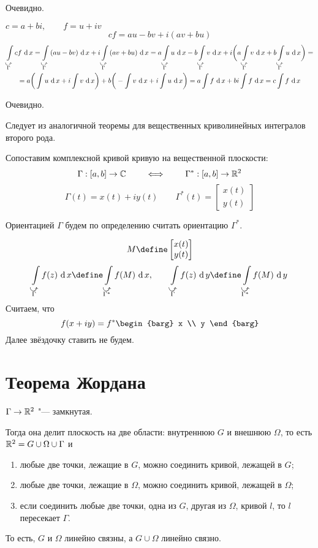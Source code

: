 \begin{eproof}
	\item Очевидно.
	\item $ c = a + bi, \qquad f = u + iv $
	$$ cf = au - bv + i(av + bu) $$
	\begin{multline*}
		\cint[x]{\curvedir \Gamma}{cf} = \cint[x]{\curvedir \Gamma}{(au - bv)} + i \cint[x]{\curvedir \Gamma}{(av + bu)} = a \cint[x]{\curvedir \Gamma}u - b \cint[x]{\curvedir \Gamma}v + i \bigg( a \cint[x]{\curvedir \Gamma}v + b \cint[x]{\curvedir \Gamma}u \bigg) = \\
		= a \bigg( \sint[x]u + i \sint[x]v \bigg) + b \bigg( - \sint[x]v + i \sint[x]u \bigg) = a \sint[x]f + bi \sint f = c \sint f
	\end{multline*}
	\item Очевидно.
	\item Следует из аналогичной теоремы для вещественных криволинейных интегралов второго рода.
\end{eproof}

Сопоставим комплексной кривой кривую на вещественной плоскости:
$$ \Gamma : [a, b] \to \mathbb{C} \qquad \iff \qquad \Gamma^* : [a, b] \to \mathbb{R}^2 $$
$$ \Gamma(t) = x(t) + iy(t) \qquad \Gamma^*(t) =
\begin{bmatrix}
	x(t) \\
	y(t)
\end{bmatrix} $$

Ориентацией $ \Gamma $ будем по определению считать ориентацию $ \Gamma^* $.

$$ M \define
\begin{bmatrix}
	x(t) \\
	y(t)
\end{bmatrix} $$
$$ \cint[x]{\curvedir \Gamma}{f(z)} \define \cint[x]{\curvedir{\Gamma^*}}{f(M)}, \qquad \cint[y]{\curvedir \Gamma}{f(z)} \define \cint[y]{\curvedir{\Gamma^*}}{f(M)} $$
Считаем, что
$$ f(x + iy) = f^*
\begin{barg}
	x \\
	y
\end{barg} $$
Далее звёздочку ставить не будем.

\section{Теорема Жордана}

\begin{theorem}
	$ \Gamma \to \mathbb{R}^2 $ "--- замкнутая.

	Тогда она делит плоскость на две области: внутреннюю $ G $ и внешнюю $ \Omega $, то есть $ \mathbb{R}^2 = G \cup \Omega \cup \Gamma $ и
	\begin{enumerate}
		\item любые две точки, лежащие в $ G $, можно соединить кривой, лежащей в $ G $;
		\item любые две точки, лежащие в $ \Omega $, можно соединить кривой, лежащей в $ \Omega $;
		\item если соединить любые две точки, одна из $ G $, другая из $ \Omega $, кривой $ l $, то $ l $ пересекает $ \Gamma $.
	\end{enumerate}
	То есть, $ G $ и $ \Omega $ линейно связны, а $ G \cup \Omega $ линейно связно.
\end{theorem}

